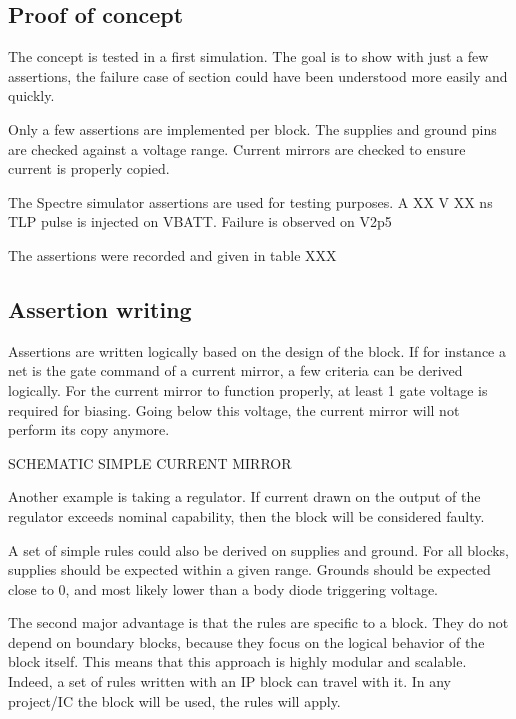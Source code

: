 \subsection{Proof of concept}

The concept is tested in a first simulation.
The goal is to show with just a few assertions, the failure case of section \label{sec:failure-case-study} could have been understood more easily and quickly.

Only a few assertions are implemented per block.
The supplies and ground pins are checked against a voltage range.
Current mirrors are checked to ensure current is properly copied.

The Spectre simulator assertions are used for testing purposes.
A XX V XX ns TLP pulse is injected on VBATT.
Failure is observed on V2p5

The assertions were recorded and given in table XXX



\subsection{Assertion writing}

Assertions are written logically based on the design of the block.
If for instance a net is the gate command of a current mirror, a few criteria can be derived logically.
For the current mirror to function properly, at least 1 gate voltage is required for biasing.
Going below this voltage, the current mirror will not perform its copy anymore.

SCHEMATIC SIMPLE CURRENT MIRROR

Another example is taking a regulator.
If current drawn on the output of the regulator exceeds nominal capability, then the block will be considered faulty.

A set of simple rules could also be derived on supplies and ground.
For all blocks, supplies should be expected within a given range.
Grounds should be expected close to 0, and most likely lower than a body diode triggering voltage.

The second major advantage is that the rules are specific to a block.
They do not depend on boundary blocks, because they focus on the logical behavior of the block itself.
This means that this approach is highly modular and scalable.
Indeed, a set of rules written with an IP block can travel with it.
In any project/IC the block will be used, the rules will apply.

